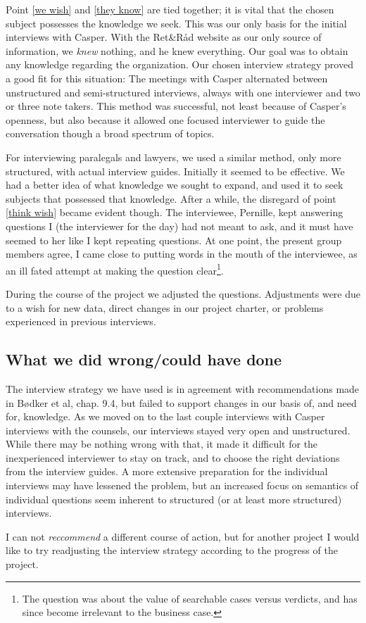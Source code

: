 \documentclass[a4paper, titlepage]{article}
\newcommand{\rr}{Ret\&Råd}
\begin{document}
Point \ref{we wish} and \ref{they know} are tied together; it is vital that the
chosen subject possesses the knowledge we seek. This was our only basis for the
initial interviews with Casper. With the \rr{} website as our only source of
information, we \textit{knew} nothing, and he knew everything. Our goal was to
obtain any knowledge regarding the organization. Our chosen interview strategy
proved a good fit for this situation: The meetings with Casper alternated
between unstructured and semi-structured interviews, always with one
interviewer and two or three note takers. This method was successful, not least
because of Casper's openness, but also because it allowed one focused
interviewer to guide the conversation though a broad spectrum of topics.

For interviewing paralegals and lawyers, we used a similar method, only more
structured, with actual interview guides. Initially it seemed to be effective.
We had a better idea of what knowledge we sought to expand, and used it to seek
subjects that possessed that knowledge. After a while, the disregard of point
\ref{think wish} became evident though. The interviewee, Pernille, kept
answering questions I (the interviewer for the day) had not meant to ask, and it
must have seemed to her like I kept repeating questions. At one point,
the present group members agree, I came close to putting words in the
mouth of the interviewee, as an ill fated attempt at making the question
clear\footnote{The question was about the value of searchable cases versus
verdicts, and has since become irrelevant to the business case.}.

During the course of the project we adjusted the questions. Adjustments were due
to a wish for new data, direct changes in our project charter, or problems
experienced in previous interviews.

\subsection*{What we did wrong/could have done}
The interview strategy we have used is in agreement with recommendations made in
Bødker et al, chap. 9.4, but failed to support changes in our basis of, and need
for, knowledge. As we moved on to the last couple interviews with Casper
interviews with the counsels, our interviews stayed very open and unstructured.
While there may be nothing wrong with that, it made it difficult for the
inexperienced interviewer to stay on track, and to choose the right deviations
from the interview guides. A more extensive preparation for the individual
interviews may have lessened the problem, but an increased focus on semantics of
individual questions seem inherent to structured (or at least more structured)
interviews.

I can not \textit{reccommend} a different course of action, but for another
project I would like to try readjusting the interview strategy according to
the progress of the project.
\end{document}
